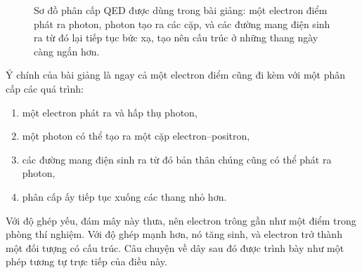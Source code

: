 \begin{figure}[htbp]
\centering
{}
\caption{Sơ đồ phân cấp QED được dùng trong bài giảng: một electron điểm phát ra photon, photon tạo ra các cặp, và các đường mang điện sinh ra từ đó lại tiếp tục bức xạ, tạo nên cấu trúc ở những thang ngày càng ngắn hơn.}
\end{figure}

Ý chính của bài giảng là ngay cả một electron điểm cũng đi kèm với một phân cấp các quá trình:
\begin{enumerate}
\item một electron phát ra và hấp thụ photon,
\item một photon có thể tạo ra một cặp electron--positron,
\item các đường mang điện sinh ra từ đó bản thân chúng cũng có thể phát ra photon,
\item phân cấp ấy tiếp tục xuống các thang nhỏ hơn.
\end{enumerate}
Với độ ghép yếu, đám mây này thưa, nên electron trông gần như một điểm trong phòng thí nghiệm. Với độ ghép mạnh hơn, nó tăng sinh, và electron trở thành một đối tượng có cấu trúc. Câu chuyện về dây sau đó được trình bày như một phép tương tự trực tiếp của điều này.

